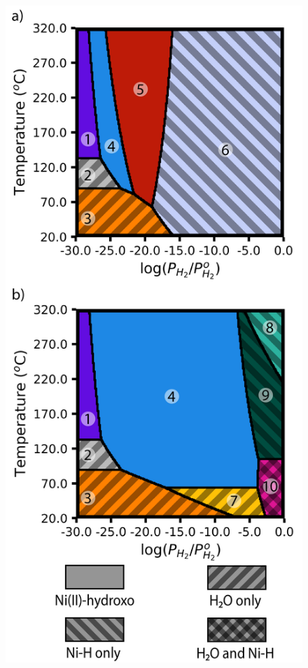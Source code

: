 \documentclass[journal=jctcce,manuscript=article]{achemso}
\begin{document}
\begin{figure}[H]
    \centering
    \includegraphics{zi-images/01-Ni-Graphics/2021-02-25-Ni-phase-diagram-combined-manuscript.png}
    \caption{
}
\end{figure}
\end{document}
